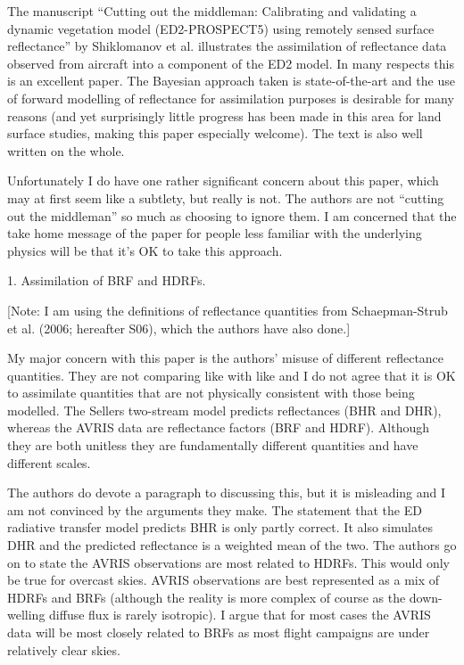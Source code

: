 \begin{reviewer}
  The manuscript “Cutting out the middleman: Calibrating and validating a dynamic vegetation model (ED2-PROSPECT5) using remotely sensed surface reflectance” by Shiklomanov et al. illustrates the assimilation of reflectance data observed from aircraft into a component of the ED2 model. In many respects this is an excellent paper. The Bayesian approach taken is state-of-the-art and the use of forward modelling of reflectance for assimilation purposes is desirable for many reasons (and yet surprisingly little progress has been made in this area for land surface studies, making this paper especially welcome). The text is also well written on the whole.

  Unfortunately I do have one rather significant concern about this paper, which may at first seem like a subtlety, but really is not. The authors are not “cutting out the middleman” so much as choosing to ignore them. I am concerned that the take home message of the paper for people less familiar with the underlying physics will be that it’s OK to take this approach.

  1. Assimilation of BRF and HDRFs.

  [Note: I am using the definitions of reflectance quantities from Schaepman-Strub et al.
  (2006; hereafter S06), which the authors have also done.]

  My major concern with this paper is the authors’ misuse of different reflectance quantities. They are not comparing like with like and I do not agree that it is OK to assimilate quantities that are not physically consistent with those being modelled. The Sellers two-stream model predicts reflectances (BHR and DHR), whereas the AVRIS data are reflectance factors (BRF and HDRF). Although they are both unitless they are fundamentally different quantities and have different scales.

  The authors do devote a paragraph to discussing this, but it is misleading and I am not convinced by the arguments they make. The statement that the ED radiative transfer model predicts BHR is only partly correct. It also simulates DHR and the predicted reflectance is a weighted mean of the two. The authors go on to state the AVRIS observations are most related to HDRFs. This would only be true for overcast skies. AVRIS observations are best represented as a mix of HDRFs and BRFs (although the reality is more complex of course as the down-welling diffuse flux is rarely isotropic). I argue that for most cases the AVRIS data will be most closely related to BRFs as most flight campaigns are under relatively clear skies.


\end{reviewer}
